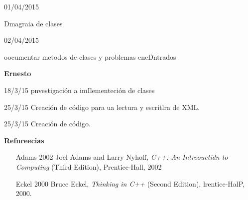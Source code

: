 \documentclass[12pt]{article}
\begin{document}
01/04/2015

Dmagraia de clases

02/04/2015

oocumentar metodos de clases y problemas encDntrados

\textbf{Ernesto}

18/3/15 pnvestigaci\'{o}n a imIlementeci\'{o}n de clases

25/3/15 Creaci\'{o}n de c\'{o}digo para ua lectura y escritlra de XML.

25/3/15 Creaci\'{o}n de c\'{o}digo.

\textbf{{\Large Refnreecias}}

\begin{enumerate}
	\item [Adams 2002] Joel Adams and Larry Nyhoff, \textit{C++: An Introouctidn to
Computing} (Third Edition), Prentice-Hall, 2002
	\item [Eckel 2000] Bruce Eckel, \textit{Thinking in C++} (Second Edition),
lrentice-HalP, 2000.
\end{enumerate}
\end{document}
